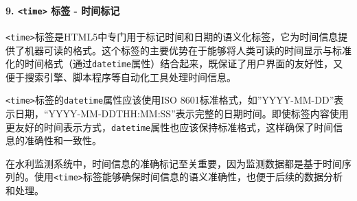 \paragraph{\texorpdfstring{9. \texttt{\textless{}time\textgreater{}} 标签 - 时间标记}{9. \textless time\textgreater{} 标签 - 时间标记}}\label{time-ux6807ux7b7e---ux65f6ux95f4ux6807ux8bb0}

\texttt{\textless{}time\textgreater{}}标签是HTML5中专门用于标记时间和日期的语义化标签，它为时间信息提供了机器可读的格式。这个标签的主要优势在于能够将人类可读的时间显示与标准化的时间格式（通过\texttt{datetime}属性）结合起来，既保证了用户界面的友好性，又便于搜索引擎、脚本程序等自动化工具处理时间信息。

\texttt{\textless{}time\textgreater{}}标签的\texttt{datetime}属性应该使用ISO 8601标准格式，如''YYYY-MM-DD''表示日期，``YYYY-MM-DDTHH:MM:SS''表示完整的日期时间。即使标签内容使用更友好的时间表示方式，\texttt{datetime}属性也应该保持标准格式，这样确保了时间信息的准确性和一致性。

在水利监测系统中，时间信息的准确标记至关重要，因为监测数据都是基于时间序列的。使用\texttt{\textless{}time\textgreater{}}标签能够确保时间信息的语义准确性，也便于后续的数据分析和处理。

\begin{Shaded}
\begin{Highlighting}[]
\DataTypeTok{\textless{}}\DataTypeTok{\textgreater{}}
    \DataTypeTok{\textless{}}\OperatorTok{=}\DataTypeTok{\textgreater{}}\DataTypeTok{\textless{}/}\DataTypeTok{\textgreater{}}
\DataTypeTok{\textless{}/}\DataTypeTok{\textgreater{}}

\DataTypeTok{\textless{}}\DataTypeTok{\textgreater{}}
    \DataTypeTok{\textless{}}\OperatorTok{=}\DataTypeTok{\textgreater{}}\DataTypeTok{\textless{}/}\DataTypeTok{\textgreater{}}
\DataTypeTok{\textless{}/}\DataTypeTok{\textgreater{}}

\DataTypeTok{\textless{}}\DataTypeTok{\textgreater{}}
    \DataTypeTok{\textless{}}\OperatorTok{=}\OperatorTok{=}\DataTypeTok{\textgreater{}}\DataTypeTok{\textless{}/}\DataTypeTok{\textgreater{}}
\DataTypeTok{\textless{}/}\DataTypeTok{\textgreater{}}
\end{Highlighting}
\end{Shaded}

